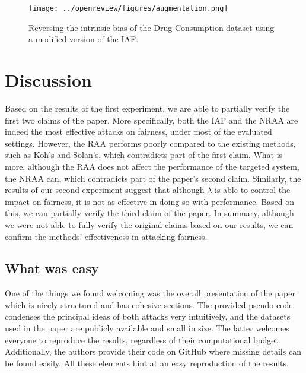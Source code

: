 \begin{figure}[htb!]
    \centering
    \texttt{[image: ../openreview/figures/augmentation.png]}
    \caption{Reversing the intrinsic bias of the Drug Consumption dataset using a modified version of the IAF.}
    \label{fig:augmentation}
\end{figure}

\section{Discussion}
Based on the results of the first experiment, we are able to partially verify the first two claims of the paper. More specifically, both the IAF and the NRAA are indeed the most effective attacks on fairness, under most of the evaluated settings. However, the RAA performs poorly compared to the existing methods, such as Koh's and Solan's, which contradicts part of the first claim. What is more, although the RAA does not affect the performance of the targeted system, the NRAA can, which contradicts part of the paper's second claim. Similarly, the results of our second experiment suggest that although $\lambda$ is able to control the impact on fairness, it is not as effective in doing so with performance. Based on this, we can partially verify the third claim of the paper. In summary, although we were not able to fully verify the original claims based on our results, we can confirm the methods' effectiveness in attacking fairness.

\subsection{What was easy}
One of the things we found welcoming was the overall presentation of the paper which is nicely structured and has cohesive sections. The provided pseudo-code condenses the principal ideas of both attacks very intuitively, and the datasets used in the paper are publicly available and small in size. The latter welcomes everyone to reproduce the results, regardless of their computational budget. Additionally, the authors provide their code on GitHub where missing details can be found easily. All these elements hint at an easy reproduction of the results.

